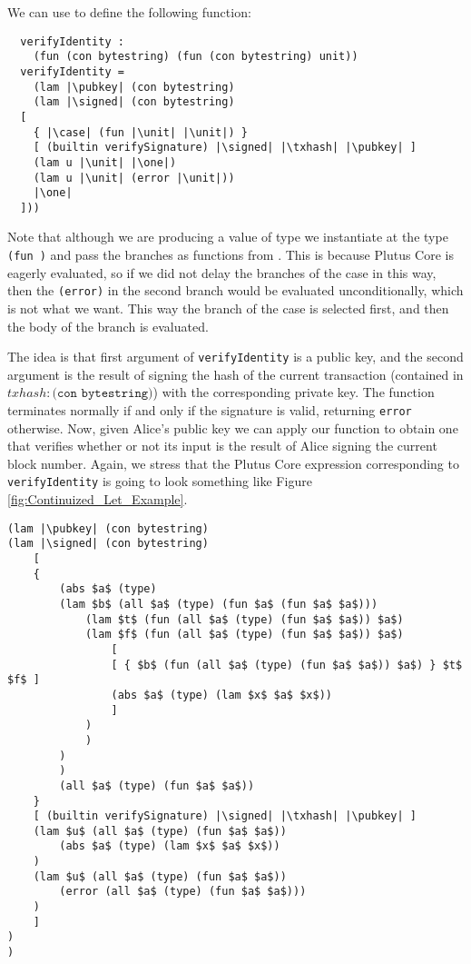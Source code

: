 \documentclass[../plutus-core-specification.tex]{subfiles}
\begin{document}
\noindent We can use \case{} to define the following function:
\begin{lstlisting}
  verifyIdentity :
    (fun (con bytestring) (fun (con bytestring) unit))
  verifyIdentity =
    (lam |\pubkey| (con bytestring)
    (lam |\signed| (con bytestring)
  [
    { |\case| (fun |\unit| |\unit|) }
    [ (builtin verifySignature) |\signed| |\txhash| |\pubkey| ]
    (lam u |\unit| |\one|)
    (lam u |\unit| (error |\unit|))
    |\one|
  ]))
\end{lstlisting}
 Note that although we are producing a value of
type \unit{} we instantiate \case{} at the type \texttt{(fun \unit \unit)} and
pass the branches as functions from \unit{}. This
is because Plutus Core is eagerly evaluated, so if we did not delay the
branches of the case in this way, then the \texttt{(error)} in the second branch
would be evaluated unconditionally, which is not what we want. This way the
branch of the case is selected first, and then the body of the branch is
evaluated.

The idea is that first argument of \texttt{verifyIdentity} is a public
key, and the second argument is the result of signing the hash of the
current transaction (contained in
$\mathit{txhash} : \texttt{(con bytestring)}$) with the corresponding
private key.  The function terminates normally if and only if the
signature is valid, returning \texttt{error} otherwise. Now, given
Alice's public key we can apply our function to obtain one that
verifies whether or not its input is the result of Alice signing the
current block number. Again, we stress that the Plutus Core expression
corresponding to \texttt{verifyIdentity} is going to look something
like Figure \ref{fig:Continuized_Let_Example}.

\newpage
\begin{figure*}[h]  %
\begin{lstlisting}
(lam |\pubkey| (con bytestring)
(lam |\signed| (con bytestring)
    [
    {
        (abs $a$ (type)
        (lam $b$ (all $a$ (type) (fun $a$ (fun $a$ $a$)))
            (lam $t$ (fun (all $a$ (type) (fun $a$ $a$)) $a$)
            (lam $f$ (fun (all $a$ (type) (fun $a$ $a$)) $a$)
                [
                [ { $b$ (fun (all $a$ (type) (fun $a$ $a$)) $a$) } $t$ $f$ ]
                (abs $a$ (type) (lam $x$ $a$ $x$))
                ]
            )
            )
        )
        )
        (all $a$ (type) (fun $a$ $a$))
    }
    [ (builtin verifySignature) |\signed| |\txhash| |\pubkey| ]
    (lam $u$ (all $a$ (type) (fun $a$ $a$))
        (abs $a$ (type) (lam $x$ $a$ $x$))
    )
    (lam $u$ (all $a$ (type) (fun $a$ $a$))
        (error (all $a$ (type) (fun $a$ $a$)))
    )
    ]
)
)
\end{lstlisting}
\caption{Example of Section 5 written out in full}
\label{fig:Continuized_Let_Example}
\end{figure*}
\end{document}
